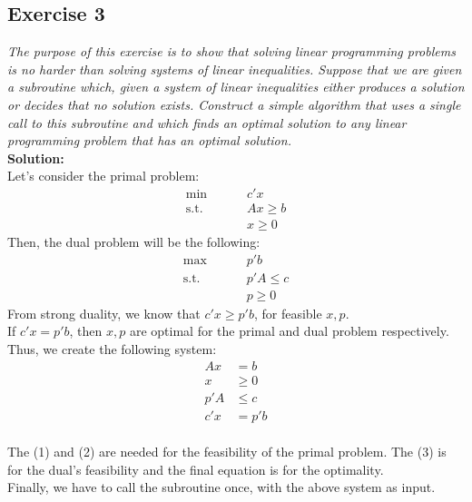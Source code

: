 \documentclass[12pt]{article}
\begin{document}
\subsection*{Exercise 3}
\textit{The purpose of this exercise is to show that solving linear programming problems is no harder than solving systems of linear inequalities. Suppose that we are given a subroutine which, given a system of linear inequalities either produces a solution or decides that no solution exists. Construct a simple algorithm that uses a single call to this subroutine and which finds an optimal solution to any linear programming problem that has an optimal solution. }
\\
\textbf{Solution:} \\  
Let's consider  the primal problem: 
\begin{align*}
\text{min } \qquad & c' x \\
\text{s.t. } \qquad  & Ax \geqslant b \\
							& x \geqslant 0
\end{align*}
Then, the dual problem will be the following: 
\begin{align*}
\text{max } \qquad & p' b \\
\text{s.t. } \qquad  & p'A \leqslant c \\
							& p \geqslant 0
\end{align*}
From strong duality, we know that $c'x \geqslant p'b$, for feasible $x,p$. \\
If $c'x = p'b$, then $x,p$ are optimal for the primal and dual problem respectively. Thus, we create the following system:
\begin{align}
Ax &= b \\
x &\geqslant 0 \\
p'A &\leqslant c \\
c'x &= p'b
\end{align} \\
The (1) and (2) are needed for the feasibility of the primal problem. The (3) is for the dual's feasibility and the final equation is for the optimality. \\
Finally, we have to call the subroutine once, with the above system as input.

\newpage

\end{document}
